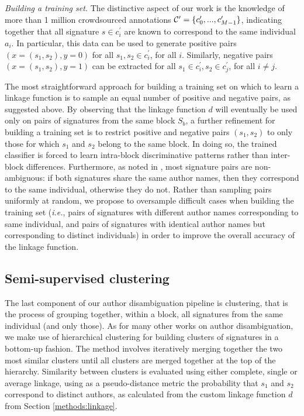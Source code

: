 \documentclass[conference]{IEEEtran}
\newcommand{\ie}{\emph{i.e.}\xspace}
\begin{document}

\textit{Building a training set.} The distinctive aspect of our work is the
knowledge of more than 1 million crowdsourced annotations ${\cal C}^\prime = \{
c_0^\prime, ..., c_{M-1}^\prime \}$, indicating together that all signature $s \in
c_i^\prime$ are known to correspond to the same individual $a_i$.
In particular, this data can be used to generate positive pairs $(x=(s_1, s_2), y=0)$ for all
$s_1, s_2 \in c_i^\prime$, for all $i$. Similarly, negative pairs $(x=(s_1,
s_2), y=1)$ can be extracted for all $s_1 \in c_i^\prime, s_2 \in c_j^\prime$, for
all $i \neq j$.

The most straightforward approach for building a training set on which to learn
a linkage function is to sample an equal number of positive and negative pairs,
as suggested above.
By observing that the linkage function $d$ will eventually
be used only on pairs of signatures from the same block $S_b$, a further
refinement for building a training set is to restrict positive and negative
pairs $(s_1, s_2)$ to only those for which $s_1$ and $s_2$ belong to the same
block. In doing so, the trained classifier is forced to learn intra-block
discriminative patterns rather than inter-block differences.
Furthermore, as noted in \cite{lange2011frequency}, most signature pairs are non-ambiguous:
if both signatures share the same author names, then
they correspond to the same individual, otherwise they do not.
Rather than sampling pairs uniformly at random, we propose to oversample
difficult cases when building the training set (\ie, pairs of signatures with
different author names corresponding to same individual, and pairs of
signatures with identical author names but corresponding to distinct
individuals) in order to improve the overall accuracy of the linkage function.

\subsection{Semi-supervised clustering}
\label{methods:clustering}

The last component of our author disambiguation pipeline is clustering, that is
the process of grouping together, within a block, all signatures from the same
individual (and only those).
As for many other works on author disambiguation, we make use of hierarchical clustering \cite{ward1963hierarchical} for
building clusters of signatures in a bottom-up fashion.
The method involves iteratively merging together the two most similar clusters until all clusters
are merged together at the top of the hierarchy.
Similarity between clusters is evaluated using either complete, single or average linkage, using
as a pseudo-distance metric the probability that $s_1$ and $s_2$ correspond to
distinct authors, as calculated from the custom linkage function $d$ from Section \ref{methods:linkage}.
\end{document}
